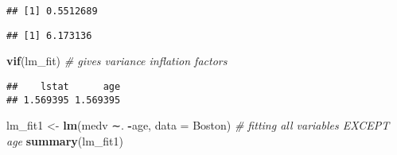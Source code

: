 \documentclass[]{article}
\newenvironment{Shaded}{\begin{snugshade}}{\end{snugshade}}
\newcommand{\CommentTok}[1]{\textcolor[rgb]{0.56,0.35,0.01}{\textit{#1}}}
\newcommand{\DataTypeTok}[1]{\textcolor[rgb]{0.13,0.29,0.53}{#1}}
\newcommand{\KeywordTok}[1]{\textcolor[rgb]{0.13,0.29,0.53}{\textbf{#1}}}
\newcommand{\NormalTok}[1]{#1}
\newcommand{\OperatorTok}[1]{\textcolor[rgb]{0.81,0.36,0.00}{\textbf{#1}}}
\newcommand{\StringTok}[1]{\textcolor[rgb]{0.31,0.60,0.02}{#1}}
\begin{document}
\begin{Shaded}
\end{Shaded}

\begin{verbatim}
## [1] 0.5512689
\end{verbatim}

\begin{Shaded}
\end{Shaded}

\begin{verbatim}
## [1] 6.173136
\end{verbatim}

\begin{Shaded}
\begin{Highlighting}[]
\KeywordTok{vif}\NormalTok{(lm_fit) }\CommentTok{# gives variance inflation factors}
\end{Highlighting}
\end{Shaded}

\begin{verbatim}
##    lstat      age 
## 1.569395 1.569395
\end{verbatim}

\begin{Shaded}
\begin{Highlighting}[]
\NormalTok{lm_fit1 <-}\StringTok{ }\KeywordTok{lm}\NormalTok{(medv ∼. }\OperatorTok{-}\NormalTok{age, }\DataTypeTok{data =}\NormalTok{ Boston) }\CommentTok{# fitting all variables EXCEPT age}
\KeywordTok{summary}\NormalTok{(lm_fit1)}
\end{Highlighting}
\end{Shaded}
\end{document}
